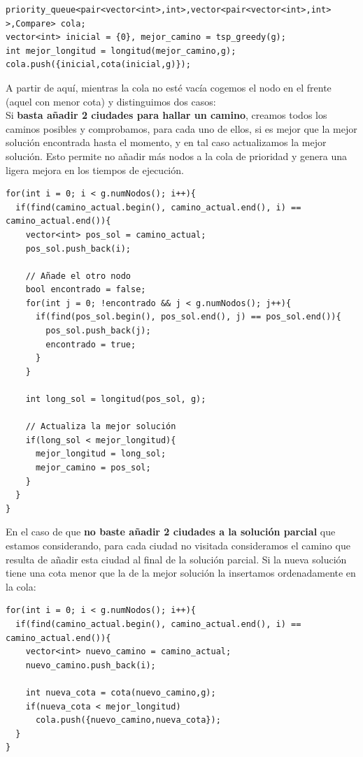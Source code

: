 \begin{lstlisting}
priority_queue<pair<vector<int>,int>,vector<pair<vector<int>,int> >,Compare> cola;
vector<int> inicial = {0}, mejor_camino = tsp_greedy(g);
int mejor_longitud = longitud(mejor_camino,g);
cola.push({inicial,cota(inicial,g)});
\end{lstlisting}

A partir de aquí, mientras la cola no esté vacía cogemos el nodo en el frente (aquel con menor cota) y distinguimos dos casos: \\

Si \textbf{basta añadir 2 ciudades para hallar un camino}, creamos todos los caminos posibles y comprobamos, para cada uno de ellos, si es mejor que la mejor solución encontrada hasta el momento, y en tal caso actualizamos la mejor solución. Esto permite no añadir más nodos a la cola de prioridad y genera una ligera mejora en los tiempos de ejecución.

\begin{lstlisting}
for(int i = 0; i < g.numNodos(); i++){
  if(find(camino_actual.begin(), camino_actual.end(), i) == camino_actual.end()){
    vector<int> pos_sol = camino_actual;
    pos_sol.push_back(i);

    // Añade el otro nodo
    bool encontrado = false;
    for(int j = 0; !encontrado && j < g.numNodos(); j++){
      if(find(pos_sol.begin(), pos_sol.end(), j) == pos_sol.end()){
        pos_sol.push_back(j);
        encontrado = true;
      }
    }

    int long_sol = longitud(pos_sol, g);

    // Actualiza la mejor solución
    if(long_sol < mejor_longitud){
      mejor_longitud = long_sol;
      mejor_camino = pos_sol;
    }
  }
}
\end{lstlisting}

En el caso de que \textbf{no baste añadir 2 ciudades a la solución parcial} que estamos considerando, para cada ciudad no visitada consideramos el camino que resulta de añadir esta ciudad al final de la solución parcial. Si la nueva solución tiene una cota menor que la de la mejor solución la insertamos ordenadamente en la cola:

\begin{lstlisting}
for(int i = 0; i < g.numNodos(); i++){
  if(find(camino_actual.begin(), camino_actual.end(), i) == camino_actual.end()){
    vector<int> nuevo_camino = camino_actual;
    nuevo_camino.push_back(i);

    int nueva_cota = cota(nuevo_camino,g);
    if(nueva_cota < mejor_longitud)
      cola.push({nuevo_camino,nueva_cota});
  }
}
\end{lstlisting}

